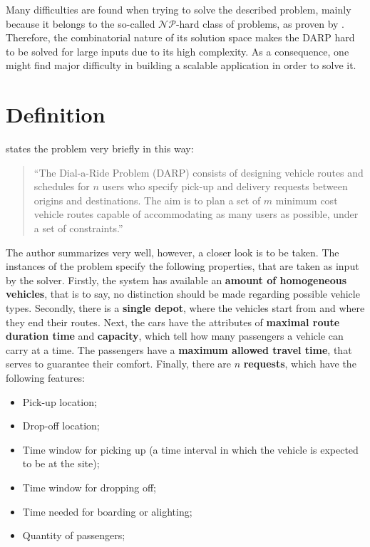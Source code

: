 \documentclass[tuberlin,cic,tc,openright,english,noabntcite,oneside]{iiufrgs}
\begin{document}
Many difficulties are found when trying to solve the described problem, mainly because it belongs to the so-called $\mathcal{NP}$-hard class of problems, as proven by \textcite{baugh_jr._intractability_1998}. Therefore, the combinatorial nature of its solution space makes the DARP hard to be solved for large inputs due to its high complexity. As a consequence, one might find major difficulty in building a scalable application in order to solve it.

\section{Definition}
\textcite[p. 29]{cordeau_dial--ride_2007} states the problem very briefly in this way:
\begin{quote}
\enquote{The Dial-a-Ride Problem (DARP) consists of designing vehicle routes and schedules for $n$ users who specify pick-up and delivery requests between origins and destinations. The aim is to plan a set of $m$ minimum cost vehicle routes capable of accommodating as many users as possible, under a set of constraints.}
\end{quote}

The author summarizes very well, however, a closer look is to be taken. The instances of the problem specify the following properties, that are taken as input by the solver. Firstly, the system has available an \textbf{amount of homogeneous vehicles}, that is to say, no distinction should be made regarding possible vehicle types. Secondly, there is a \textbf{single depot}, where the vehicles start from and where they end their routes. Next, the cars have the attributes of \textbf{maximal route duration time} and \textbf{capacity}, which tell how many passengers a vehicle can carry at a time. The passengers have a \textbf{maximum allowed travel time}, that serves to guarantee their comfort. Finally, there are $n$ \textbf{requests}, which have the following features:

\begin{itemize}
\item Pick-up location;
\item Drop-off location;
\item Time window for picking up (a time interval in which the vehicle is expected to be at the site);
\item Time window for dropping off;
\item Time needed for boarding or alighting;
\item Quantity of passengers;
\end{itemize}
\end{document}
